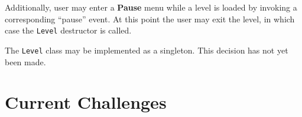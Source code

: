 \documentclass{article}
\begin{document}
Additionally, user may enter a \textbf{Pause} menu while a level is loaded by invoking a corresponding ``pause'' event.
At this point the user may exit the level, in which case the \texttt{Level} destructor is called.

The \texttt{Level} class may be implemented as a singleton. This decision has not yet been made.

\section{Current Challenges}

\end{document}

